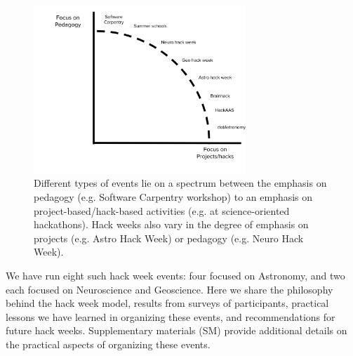
\begin{figure}
\begin{center}
\includegraphics[width=8cm]{NewHackSpectrum.pdf}
\caption{Different types of events lie on a spectrum between the emphasis on pedagogy (e.g. Software Carpentry workshop) to an emphasis on project-based/hack-based activities (e.g. at science-oriented hackathons). Hack weeks also vary in the degree of emphasis on projects (e.g. Astro Hack Week) or pedagogy (e.g. Neuro Hack Week).}
\label{fig:hackspectrum}
\end{center}
\end{figure}

We have run eight such hack week events: four focused on Astronomy, and two each focused on Neuroscience and Geoscience.
Here we share the philosophy behind the hack week model, results from surveys of participants, practical lessons we have learned in organizing these events, and recommendations for future hack weeks. Supplementary materials (SM) provide additional details on the practical aspects of organizing these events.
